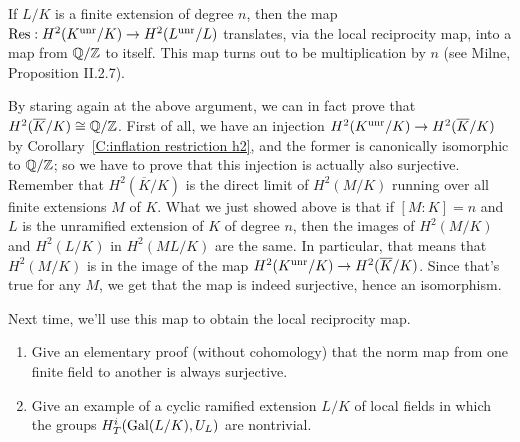 If $L/K$ is a finite extension of degree $n$, then the map
$\operatorname{Res}: H^2(K^{\operatorname{unr}}/K) \to H^2(L^{\operatorname{unr}}/L)$ translates, via the local
reciprocity map, into a map from $\mathbb{Q}/\mathbb{Z}$ to itself. This map turns out
to be multiplication by $n$ (see Milne, Proposition II.2.7).


By staring again at the above argument, we can in fact prove that
$H^2(\overline{K}/K) \cong \mathbb{Q}/\mathbb{Z}$.
First of all, we have
an injection $H^2(K^{\operatorname{unr}}/K) \to H^2(\overline{K}/K)$ by
Corollary~\ref{C:inflation restriction h2}, and the former is canonically
isomorphic to $\mathbb{Q}/\mathbb{Z}$; so we have to prove that this injection is
actually also surjective. Remember that $H^2(\overline{K}/K)$ is the
direct limit of $H^2(M/K)$ running over all finite extensions $M$ of $K$.
What we just showed above is that if $[M:K] = n$ and $L$ is the unramified
extension of $K$ of degree $n$, then the images of $H^2(M/K)$ and
$H^2(L/K)$ in $H^2(ML/K)$ are the same. In particular, that means that
$H^2(M/K)$ is in the image of the map $H^2(K^{\operatorname{unr}}/K) \to 
H^2(\overline{K}/K)$. Since that's true for any $M$, we get that the
map is indeed surjective, hence an isomorphism.

Next time, we'll use this map to obtain the local reciprocity map.


\begin{enumerate}
\item
Give an elementary proof (without cohomology)
that the norm map from one finite field to another
is always surjective.
\item
Give an example of a cyclic ramified extension $L/K$ of local fields
in which the groups $H^i_T(\operatorname{Gal}(L/K), U_L)$ are nontrivial.
\end{enumerate}

%
